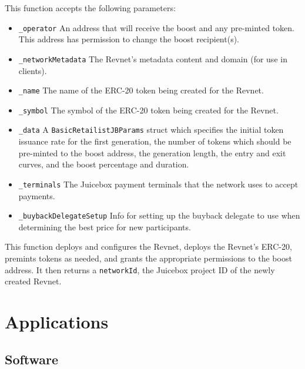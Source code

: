 \documentclass{article}
\begin{document}
This function accepts the following parameters:

\begin{itemize}
  \item \texttt{\_operator} An address that will receive the boost and any pre-minted token. This address has permission to change the boost recipient(s).
  \item \texttt{\_networkMetadata} The Revnet's metadata content and domain (for use in clients).
  \item \texttt{\_name} The name of the ERC-20 token being created for the Revnet.
  \item \texttt{\_symbol} The symbol of the ERC-20 token being created for the Revnet.
  \item \texttt{\_data} A \texttt{BasicRetailistJBParams} struct which specifies the initial token issuance rate for the first generation, the number of tokens which should be pre-minted to the boost address, the generation length, the entry and exit curves, and the boost percentage and duration.
  \item \texttt{\_terminals} The Juicebox payment terminals that the network uses to accept payments.
  \item \texttt{\_buybackDelegateSetup} Info for setting up the buyback delegate to use when determining the best price for new participants.
\end{itemize}

This function deploys and configures the Revnet, deploys the Revnet's ERC-20, premints tokens as needed, and grants the appropriate permissions to the boost address. It then returns a \texttt{networkId}, the Juicebox project ID of the newly created Revnet.

\section{Applications}


\subsection{}

\subsection{Software}
\end{document}

